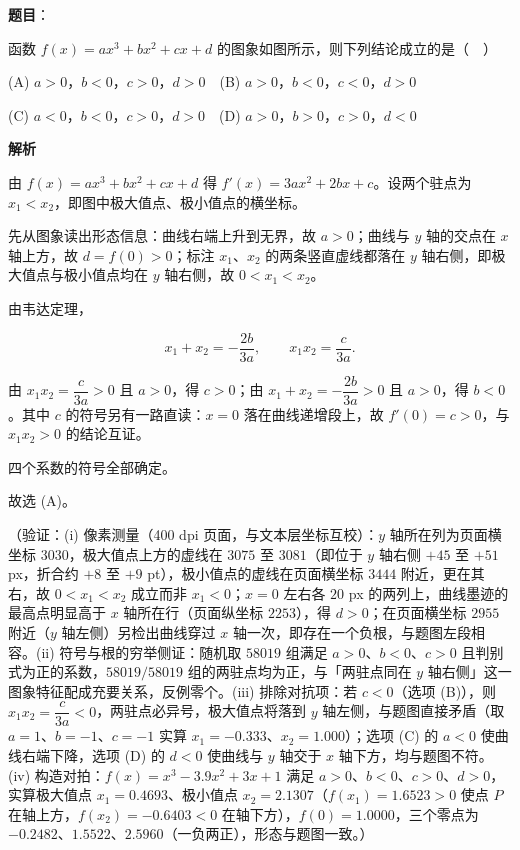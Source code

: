 \begin{answer}

\textbf{题目}：

函数 \(f(x)=ax^3+bx^2+cx+d\) 的图象如图所示，则下列结论成立的是（　）
\nopagebreak[4]
\begin{center}\end{center}
\nopagebreak[4]
(A) \(a>0\)，\(b<0\)，\(c>0\)，\(d>0\)　(B) \(a>0\)，\(b<0\)，\(c<0\)，\(d>0\)

(C) \(a<0\)，\(b<0\)，\(c>0\)，\(d>0\)　(D) \(a>0\)，\(b>0\)，\(c>0\)，\(d<0\)

\textbf{解析}

由 \(f(x)=ax^3+bx^2+cx+d\) 得 \(f'(x)=3ax^2+2bx+c\)。设两个驻点为 \(x_1<x_2\)，即图中极大值点、极小值点的横坐标。

先从图象读出形态信息：曲线右端上升到无界，故 \(a>0\)；曲线与 \(y\) 轴的交点在 \(x\) 轴上方，故 \(d=f(0)>0\)；标注 \(x_1\)、\(x_2\) 的两条竖直虚线都落在 \(y\) 轴右侧，即极大值点与极小值点均在 \(y\) 轴右侧，故 \(0<x_1<x_2\)。

由韦达定理，

\nopagebreak[4]
\[
x_1+x_2=-\dfrac{2b}{3a},\qquad x_1x_2=\dfrac{c}{3a}.
\]

由 \(x_1x_2=\dfrac{c}{3a}>0\) 且 \(a>0\)，得 \(c>0\)；由 \(x_1+x_2=-\dfrac{2b}{3a}>0\) 且 \(a>0\)，得 \(b<0\)。其中 \(c\) 的符号另有一路直读：\(x=0\) 落在曲线递增段上，故 \(f'(0)=c>0\)，与 \(x_1x_2>0\) 的结论互证。

四个系数的符号全部确定。

故选 (A)。

（验证：(i) 像素测量（400 dpi 页面，与文本层坐标互校）：\(y\) 轴所在列为页面横坐标 \(3030\)，极大值点上方的虚线在 \(3075\) 至 \(3081\)（即位于 \(y\) 轴右侧 \(+45\) 至 \(+51\) px，折合约 \(+8\) 至 \(+9\) pt），极小值点的虚线在页面横坐标 \(3444\) 附近，更在其右，故 \(0<x_1<x_2\) 成立而非 \(x_1<0\)；\(x=0\) 左右各 \(20\) px 的两列上，曲线墨迹的最高点明显高于 \(x\) 轴所在行（页面纵坐标 \(2253\)），得 \(d>0\)；在页面横坐标 \(2955\) 附近（\(y\) 轴左侧）另检出曲线穿过 \(x\) 轴一次，即存在一个负根，与题图左段相容。(ii) 符号与根的穷举侧证：随机取 \(58019\) 组满足 \(a>0\)、\(b<0\)、\(c>0\) 且判别式为正的系数，\(58019/58019\) 组的两驻点均为正，与「两驻点同在 \(y\) 轴右侧」这一图象特征配成充要关系，反例零个。(iii) 排除对抗项：若 \(c<0\)（选项 (B)），则 \(x_1x_2=\dfrac{c}{3a}<0\)，两驻点必异号，极大值点将落到 \(y\) 轴左侧，与题图直接矛盾（取 \(a=1\)、\(b=-1\)、\(c=-1\) 实算 \(x_1=-0.333\)、\(x_2=1.000\)）；选项 (C) 的 \(a<0\) 使曲线右端下降，选项 (D) 的 \(d<0\) 使曲线与 \(y\) 轴交于 \(x\) 轴下方，均与题图不符。(iv) 构造对拍：\(f(x)=x^3-3.9x^2+3x+1\) 满足 \(a>0\)、\(b<0\)、\(c>0\)、\(d>0\)，实算极大值点 \(x_1=0.4693\)、极小值点 \(x_2=2.1307\)（\(f(x_1)=1.6523>0\) 使点 \(P\) 在轴上方，\(f(x_2)=-0.6403<0\) 在轴下方），\(f(0)=1.0000\)，三个零点为 \(-0.2482\)、\(1.5522\)、\(2.5960\)（一负两正），形态与题图一致。）


\end{answer}
